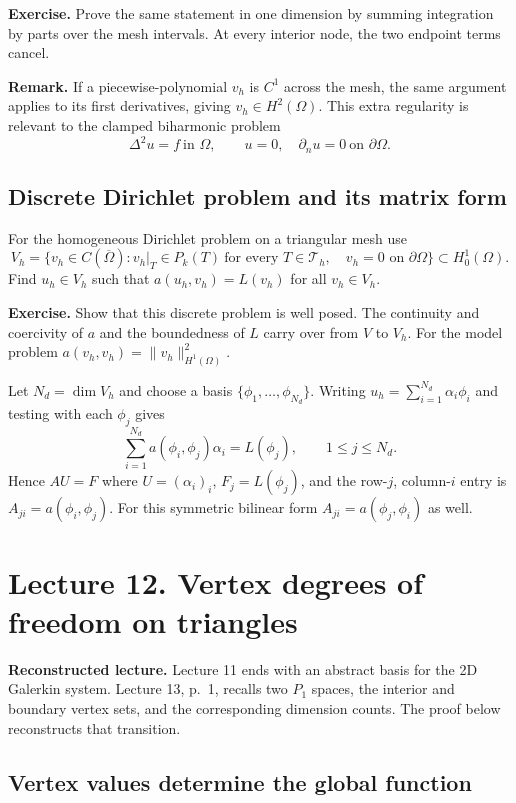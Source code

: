 \documentclass[11pt,a4paper]{article}
\newcommand{\editorialnote}[1]{%
  \par\noindent\colorbox{Tint}{\parbox{\dimexpr\linewidth-2\fboxsep\relax}{#1}}\par}
\begin{document}
\textbf{Exercise.} Prove the same statement in one dimension by summing
integration by parts over the mesh intervals. At every interior node,
the two endpoint terms cancel.

\textbf{Remark.} If a piecewise-polynomial \(v_h\) is \(C^1\) across
the mesh, the same argument applies to its first derivatives, giving
\(v_h\in H^2(\Omega)\). This extra regularity is relevant to the clamped
biharmonic problem
\[
 \Delta^2u=f\ \text{in }\Omega,\qquad
 u=0,\quad \partial_nu=0\ \text{on }\partial\Omega.
\]

\subsection{Discrete Dirichlet problem and its matrix form}

For the homogeneous Dirichlet problem on a triangular mesh use
\[
 V_h=\bigl\{v_h\in C(\overline\Omega):
 v_h|_T\in P_k(T)\ \text{for every }T\in\mathcal T_h,\quad
 v_h=0\text{ on }\partial\Omega\bigr\}\subset H_0^1(\Omega).
\]
Find \(u_h\in V_h\) such that \(a(u_h,v_h)=L(v_h)\) for all \(v_h\in V_h\).

\textbf{Exercise.} Show that this discrete problem is well posed. The
continuity and coercivity of \(a\) and the boundedness of \(L\) carry over
from \(V\) to \(V_h\). For the model problem
\(a(v_h,v_h)=\|v_h\|_{H^1(\Omega)}^2\).

Let \(N_d=\dim V_h\) and choose a basis \(\{\phi_1,\ldots,\phi_{N_d}\}\).
Writing \(u_h=\sum_{i=1}^{N_d}\alpha_i\phi_i\) and testing with each
\(\phi_j\) gives
\[
 \sum_{i=1}^{N_d} a(\phi_i,\phi_j)\alpha_i=L(\phi_j),
 \qquad 1\leq j\leq N_d .
\]
Hence \(AU=F\) where \(U=(\alpha_i)_i\), \(F_j=L(\phi_j)\), and the
row-\(j\), column-\(i\) entry is \(A_{ji}=a(\phi_i,\phi_j)\).
For this symmetric bilinear form \(A_{ji}=a(\phi_j,\phi_i)\) as well.

\clearpage
\section{Lecture 12. Vertex degrees of freedom on triangles}

\editorialnote{\textbf{Reconstructed lecture.} Lecture 11 ends with an
abstract basis for the 2D Galerkin system. Lecture 13, p.~1, recalls two
\(P_1\) spaces, the interior and boundary vertex sets, and the corresponding
dimension counts. The proof below reconstructs that transition.}

\subsection{Vertex values determine the global function}
\end{document}

